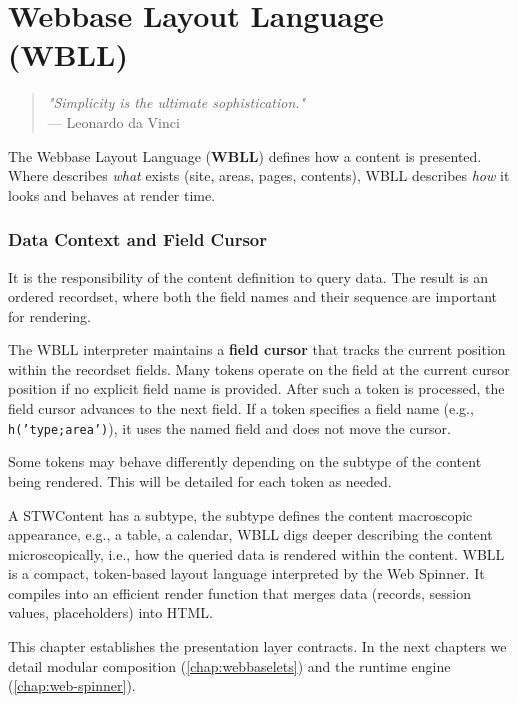 
\chapter{Webbase Layout Language (WBLL)}
\label{chap:wbll}

\begin{quote}
\textit{"Simplicity is the ultimate sophistication."} \\
— Leonardo da Vinci
\end{quote}


The Webbase Layout Language (\textbf{WBLL}) defines how a content is presented. Where \wbdl{} describes \textit{what} exists (site, areas, pages, contents), WBLL describes \textit{how} it looks and behaves at render time.

\subsection{Data Context and Field Cursor}

It is the responsibility of the \wbdl{} content definition to query data. The result is an ordered recordset, where both the field names and their sequence are important for rendering.

The WBLL interpreter maintains a \textbf{field cursor} that tracks the current position within the recordset fields. Many tokens operate on the field at the current cursor position if no explicit field name is provided. After such a token is processed, the field cursor advances to the next field. If a token specifies a field name (e.g., \texttt{h('type;area')}), it uses the named field and does not move the cursor.

Some tokens may behave differently depending on the subtype of the content being rendered. This will be detailed for each token as needed.

A STWContent has a subtype, the subtype defines the content macroscopic appearance, e.g., a table, a calendar, WBLL digs deeper describing the content microscopically, i.e., how the queried data is rendered within the content. WBLL is a compact, token-based layout language interpreted by the Web Spinner. It compiles into an efficient render function that merges data (records, session values, placeholders) into HTML.



This chapter establishes the presentation layer contracts. In the next chapters we detail modular composition (\cref{chap:webbaselets}) and the runtime engine (\cref{chap:web-spinner}).

